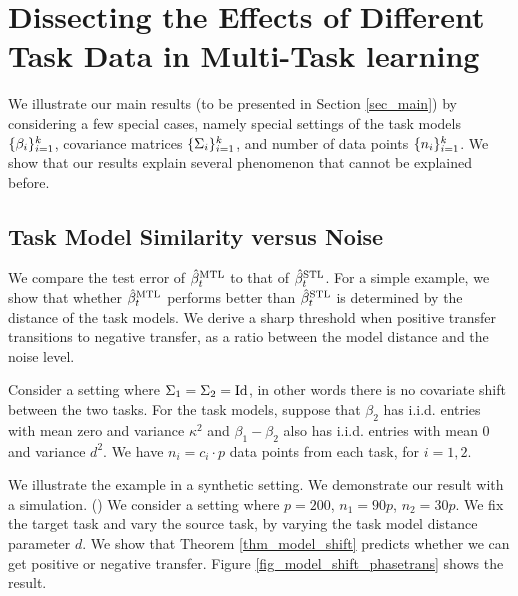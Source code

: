 \section{Dissecting the Effects of Different Task Data in Multi-Task learning}\label{sec_insight}

We illustrate our main results (to be presented in Section \ref{sec_main}) by considering a few special cases, namely special settings of the task models $\{\beta_i\}_{i=1}^k$, covariance matrices $\{\Sigma_i\}_{i=1}^k$, and number of data points $\{n_i\}_{i=1}^k$.
We show that our results explain several phenomenon that cannot be explained before.

\subsection{Task Model Similarity versus Noise}\label{sec_dist}

We compare the test error of $\hat{\beta}_t^{\text{MTL}}$ to that of $\hat{\beta}_t^{\text{STL}}$.
For a simple example, we show that whether $\hat{\beta}_t^{\text{MTL}}$ performs better than $\hat{\beta}_t^{\text{STL}}$ is determined by the distance of the task models.
We derive a sharp threshold when positive transfer transitions to negative transfer, as a ratio between the model distance and the noise level.

\begin{example}\label{ex_basic}
	Consider a setting where $\Sigma_1 = \Sigma_2 = \operatorname{Id}$, in other words there is no covariate shift between the two tasks.
	For the task models, suppose that $\beta_2$ has i.i.d. entries with mean zero and variance $\kappa^2$ and $\beta_1 - \beta_2$ also has i.i.d. entries with mean $0$ and variance $d^2$.
	We have $n_i = c_i \cdot p$ data points from each task, for $i = 1, 2$.
\end{example}

We illustrate the example in a synthetic setting.
We demonstrate our result with a simulation. ()
We consider a setting where $p = 200$, $n_1 = 90p$, $n_2 = 30p$.
We fix the target task and vary the source task, by varying the task model distance parameter $d$.
We show that Theorem \ref{thm_model_shift} predicts whether we can get positive or negative transfer.
Figure \ref{fig_model_shift_phasetrans} shows the result.

